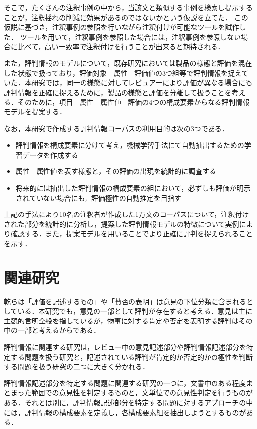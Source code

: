 \documentclass[japanese]{jnlp_1.4}
\begin{document}
そこで，たくさんの注釈事例の中から，当該文と類似する事例を検索し提示することが，注釈揺れの削減に効果があるのではないかという仮説を立てた．
この仮説に基づき，注釈事例の参照を行いながら注釈付けが可能なツールを試作した．
ツールを用いて，注釈事例を参照した場合には，注釈事例を参照しない場合に比べて，高い一致率で注釈付けを行うことが出来ると期待される．

また，評判情報のモデルについて，既存研究においては製品の様態と評価を混在した状態で扱っており，評価対象—属性—評価値の3つ組等で評判情報を捉えていた．本研究では，同一の様態に対してレビュアーにより評価が異なる場合にも評判情報を正確に捉えるために，製品の様態と評価を分離して扱うことを考える．そのために，項目—属性—属性値—評価の4つの構成要素からなる評判情報モデルを提案する．

なお，本研究で作成する評判情報コーパスの利用目的は次の3つである．

\begin{itemize}
\item
評判情報を構成要素に分けて考え，機械学習手法にて自動抽出するための学習データを作成する
\item
属性—属性値を表す様態と，その評価の出現を統計的に調査する
\item
将来的には抽出した評判情報の構成要素の組において，必ずしも評価が明示されていない場合にも，評価極性の自動推定を目指す
\end{itemize}

上記の手法により10名の注釈者が作成した1万文のコーパスについて，注釈付けされた部分を統計的に分析し，提案した評判情報モデルの特徴について実例により確認する．また，提案モデルを用いることでより正確に評判を捉えられることを示す．





\section{関連研究}
\label{sec:関連研究}

乾らは「評価を記述するもの」や「賛否の表明」は意見の下位分類に含まれるとしている．本研究でも，意見の一部として評判が存在すると考える．意見は主に主観的言明全般を指しているが，物事に対する肯定や否定を表明する評判はその中の一部と考えるからである．

評判情報に関連する研究は，レビュー中の意見記述部分や評判情報記述部分を特定する問題を扱う研究と，記述されている評判が肯定的か否定的かの極性を判断する問題を扱う研究の二つに大きく分かれる．

評判情報記述部分を特定する問題に関連する研究の一つに，文書中のある程度まとまった範囲での意見性を判定するものと，文単位での意見性判定を行うものがある．それとは別に，評判情報記述部分を特定する問題に対するアプローチの中には，評判情報の構成要素を定義し，各構成要素組を抽出しようとするものがある．
\end{document}
